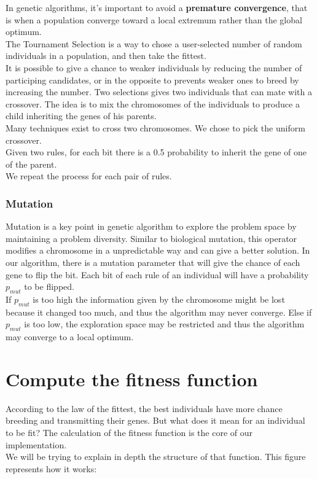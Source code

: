 \documentclass[a4paper,12pt]{article}
\begin{document}
In genetic algorithms, it's important to avoid a \textbf{premature convergence}, that is when a population converge toward a local extremum rather than the global optimum. \\
The Tournament Selection is a way to chose a user-selected number of random individuals in a population, and then take the fittest.\\
It is possible to give a chance to weaker individuals by reducing the number of participing candidates, or in the opposite to prevents weaker ones to breed by increasing the number.
Two selections gives two individuals that can mate with a crossover.
The idea is to mix the chromosomes of the individuals to produce a child inheriting the genes of his parents.\\
Many techniques exist to cross two chromosomes. We chose to pick the uniform crossover.\\
Given two rules, for each bit there is a 0.5 probability to inherit the gene of one of the parent.\\
We repeat the process for each pair of rules.

\subsubsection{Mutation}

Mutation is a key point in genetic algorithm to explore the problem space by maintaining a problem diversity. Similar to biological mutation, this operator modifies a chromosome in a unpredictable way and can give a better solution.
In our algorithm, there is a mutation parameter that will give the chance of each gene to flip the bit. Each bit of each rule of an individual will have a probability $p_{mut}$ to be flipped.\\
If $p_{mut}$ is too high the information given by the chromosome might be lost because it changed too much, and thus the algorithm may never converge. Else if $p_{mut}$ is too low, the exploration space may be restricted and thus the algorithm may converge to a local optimum.

\newpage

\section{Compute the fitness function}

According to the law of the fittest, the best individuals have more chance breeding and transmitting their genes. But what does it mean for an individual to be fit?
The calculation of the fitness function is the core of our implementation.\\
We will be trying to explain in depth the structure of that function.
This figure represents how it works:\\
\end{document}
